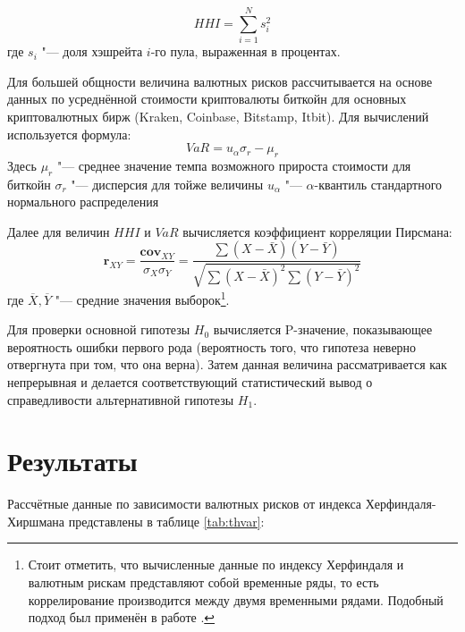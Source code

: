 \documentclass[12pt]{article}
\begin{document}
\begin{equation}
HHI =\sum_{i=1}^N s_i^2
\end{equation}
где $s_i$ "--- доля хэшрейта $i$-го пула, выраженная в процентах.

\par Для большей общности величина валютных рисков рассчитывается на основе данных по усреднённой стоимости криптовалюты биткойн для основных криптовалютных бирж (Kraken, Coinbase, Bitstamp, Itbit). Для вычислений используется формула:
\begin{equation}
VaR=u_{{\alpha }}\sigma _{r}-\mu _{r}
\end{equation}
Здесь \newline
$\mu _{r}$ "--- среднее значение темпа возможного прироста стоимости для биткойн \newline
$\sigma _{r}$ "--- дисперсия для тойже величины \newline
$u_{{\alpha }}$ "--- $\alpha$-квантиль стандартного нормального распределения

\par Далее для величин $HHI$ и $VaR$ вычисляется коэффициент корреляции Пирсмана:
\begin{equation} \label{eqn:r}
\mathbf {r}_{XY}={\frac {\mathbf {cov}_{XY}}{{\sigma}_{X}{\sigma}_{Y}}}={\frac {\sum (X-{\bar {X}})(Y-{\bar {Y}})}{\sqrt {\sum (X-{\bar {X}})^{2}\sum (Y-{\bar {Y}})^{2}}}}
\end{equation}
где 
$\overline {X}, \overline{Y}$ "--- средние значения выборок\footnote{Стоит отметить, что вычисленные данные по индексу Херфиндаля и валютным рискам представляют собой временные ряды, то есть коррелирование производится между двумя временными рядами. Подобный подход был применён в работе \cite{Kenneth}.}.

\par Для проверки основной гипотезы $H_0$ вычисляется P-значение, показывающее вероятность ошибки первого рода (вероятность того, что гипотеза неверно отвергнута при том, что она верна). Затем данная величина рассматривается как непрерывная и делается соответствующий статистический вывод о справедливости альтернативной гипотезы $H_1$.


\section{Результаты}

Рассчётные данные по зависимости валютных рисков от индекса Херфиндаля-Хиршмана представлены в таблице \ref{tab:thvar}:
\end{document}
